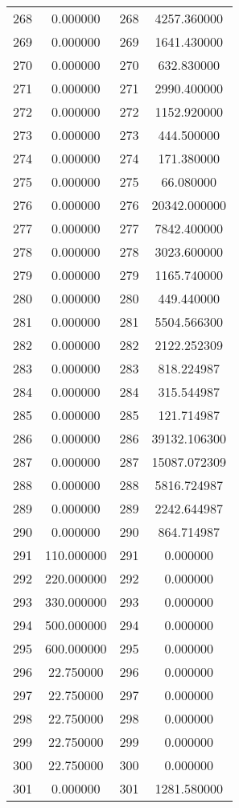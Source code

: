 \documentclass[12pt]{article}
\begin{document}
\begin{longtable}{@{}cccc@{}}
268 & 0.000000 & 268 & 4257.360000 \\
269 & 0.000000 & 269 & 1641.430000 \\
270 & 0.000000 & 270 & 632.830000 \\
271 & 0.000000 & 271 & 2990.400000 \\
272 & 0.000000 & 272 & 1152.920000 \\
273 & 0.000000 & 273 & 444.500000 \\
274 & 0.000000 & 274 & 171.380000 \\
275 & 0.000000 & 275 & 66.080000 \\
276 & 0.000000 & 276 & 20342.000000 \\
277 & 0.000000 & 277 & 7842.400000 \\
278 & 0.000000 & 278 & 3023.600000 \\
279 & 0.000000 & 279 & 1165.740000 \\
280 & 0.000000 & 280 & 449.440000 \\
281 & 0.000000 & 281 & 5504.566300 \\
282 & 0.000000 & 282 & 2122.252309 \\
283 & 0.000000 & 283 & 818.224987 \\
284 & 0.000000 & 284 & 315.544987 \\
285 & 0.000000 & 285 & 121.714987 \\
286 & 0.000000 & 286 & 39132.106300 \\
287 & 0.000000 & 287 & 15087.072309 \\
288 & 0.000000 & 288 & 5816.724987 \\
289 & 0.000000 & 289 & 2242.644987 \\
290 & 0.000000 & 290 & 864.714987 \\
291 & 110.000000 & 291 & 0.000000 \\
292 & 220.000000 & 292 & 0.000000 \\
293 & 330.000000 & 293 & 0.000000 \\
294 & 500.000000 & 294 & 0.000000 \\
295 & 600.000000 & 295 & 0.000000 \\
296 & 22.750000 & 296 & 0.000000 \\
297 & 22.750000 & 297 & 0.000000 \\
298 & 22.750000 & 298 & 0.000000 \\
299 & 22.750000 & 299 & 0.000000 \\
300 & 22.750000 & 300 & 0.000000 \\
301 & 0.000000 & 301 & 1281.580000 \\

\end{longtable}
\end{document}
